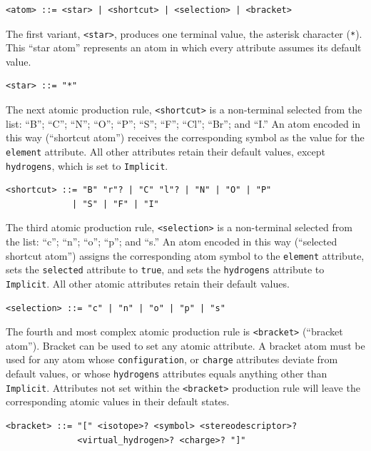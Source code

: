 \documentclass{article}
\def\ttt{\texttt}
\begin{document}
\begin{lstlisting}
<atom> ::= <star> | <shortcut> | <selection> | <bracket>
\end{lstlisting}

The first variant, \ttt{<star>}, produces one terminal value, the asterisk character (\ttt{*}). This \enquote{star atom} represents an atom in which every attribute assumes its default value.

\begin{lstlisting}
<star> ::= "*"
\end{lstlisting}

The next atomic production rule, \ttt{<shortcut>} is a non-terminal selected from the list: \enquote{B}; \enquote{C}; \enquote{N}; \enquote{O}; \enquote{P}; \enquote{S}; \enquote{F}; \enquote{Cl}; \enquote{Br}; and \enquote{I.} An atom encoded in this way (\enquote{shortcut atom}) receives the corresponding symbol as the value for the \ttt{element} attribute. All other attributes retain their default values, except \ttt{hydrogens}, which is set to \ttt{Implicit}.

\begin{lstlisting}
<shortcut> ::= "B" "r"? | "C" "l"? | "N" | "O" | "P"
             | "S" | "F" | "I"
\end{lstlisting}

The third atomic production rule, \ttt{<selection>} is a non-terminal selected from the list: \enquote{c}; \enquote{n}; \enquote{o}; \enquote{p}; and \enquote{s.} An atom encoded in this way (\enquote{selected shortcut atom}) assigns the corresponding atom symbol to the \ttt{element} attribute, sets the \ttt{selected} attribute to \ttt{true}, and sets the \ttt{hydrogens} attribute to \ttt{Implicit}. All other atomic attributes retain their default values.

\begin{lstlisting}
<selection> ::= "c" | "n" | "o" | "p" | "s"
\end{lstlisting}

The fourth and most complex atomic production rule is \ttt{<bracket>} (\enquote{bracket atom}). Bracket can be used to set any atomic attribute. A bracket atom must be used for any atom whose \ttt{configuration}, or \ttt{charge} attributes deviate from default values, or whose \ttt{hydrogens} attributes equals anything other than \ttt{Implicit}. Attributes not set within the \ttt{<bracket>} production rule will leave the corresponding atomic values in their default states.

\begin{lstlisting}
<bracket> ::= "[" <isotope>? <symbol> <stereodescriptor>?
              <virtual_hydrogen>? <charge>? "]"
\end{lstlisting}
\end{document}
